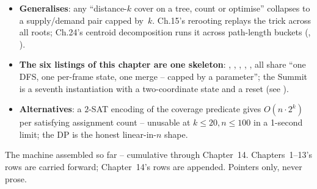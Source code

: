 \begin{hardeningbox}
\begin{itemize}[nosep, leftmargin=1.4em]
  \item \textbf{Generalises}: any ``distance-$k$ cover on a tree, count or
        optimise'' collapses to a supply/demand pair capped by~$k$. Ch.15's
        rerooting replays the trick across all roots; Ch.24's centroid
        decomposition runs it across path-length buckets (, ).
  \item \textbf{The six listings of this chapter are one skeleton}:
        , , ,
        , , 
        all share ``one DFS, one per-frame state, one merge -- capped by a
        parameter''; the Summit is a seventh instantiation with a two-coordinate
        state and a reset (see ).
  \item \textbf{Alternatives}: a $2$-SAT encoding of the coverage predicate
        gives $O(n \cdot 2^k)$ per satisfying assignment count -- unusable
        at $k \le 20, n \le 100$ in a 1-second limit; the DP is the honest
        linear-in-$n$ shape.
\end{itemize}
\end{hardeningbox}


The machine assembled so far -- cumulative through Chapter~14. Chapters~1--13's
rows are carried forward; Chapter~14's rows are appended. Pointers only, never prose.

